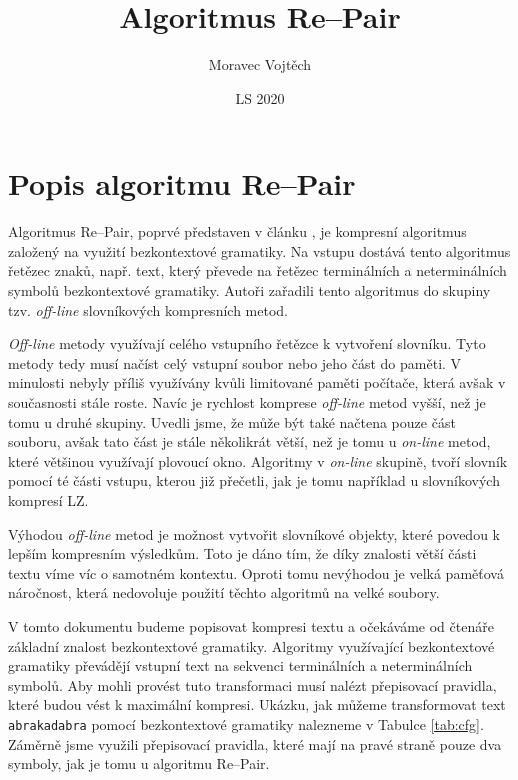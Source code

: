 \documentclass[a4paper,12pt]{article}
\author{Moravec Vojtěch}
\title{Algoritmus Re--Pair}
\date{LS 2020}
\begin{document}
\maketitle
\newpage

\section{Popis algoritmu Re--Pair}
Algoritmus Re--Pair, poprvé představen v článku \cite{892708}, je kompresní algoritmus založený na využití bezkontextové gramatiky. Na vstupu dostává tento algoritmus řetězec znaků, např. text, který převede na řetězec terminálních a neterminálních symbolů bezkontextové gramatiky. Autoři zařadili tento algoritmus do skupiny tzv. \emph{off-line} slovníkových kompresních metod.

\emph{Off-line} metody využívají celého vstupního řetězce k vytvoření slovníku. Tyto metody tedy musí načíst celý vstupní soubor nebo jeho část do paměti. V minulosti nebyly příliš využívány kvůli limitované paměti počítače, která avšak v současnosti stále roste. Navíc je rychlost komprese \emph{off-line} metod vyšší, než je tomu u druhé skupiny. Uvedli jsme, že může být také načtena pouze část souboru, avšak tato část je stále několikrát větší, než je tomu u \emph{on-line} metod, které většinou využívají plovoucí okno. Algoritmy v \emph{on-line} skupině, tvoří slovník pomocí té části vstupu, kterou již přečetli, jak je tomu například \linebreak u slovníkových kompresí LZ. 

Výhodou \emph{off-line} metod je možnost vytvořit slovníkové objekty, které povedou k lepším kompresním výsledkům. Toto je dáno tím, že díky znalosti větší části textu víme víc o samotném kontextu. Oproti tomu nevýhodou je velká paměťová náročnost, která nedovoluje použití těchto algoritmů na velké soubory.

V tomto dokumentu budeme popisovat kompresi textu a očekáváme od čtenáře základní znalost bezkontextové gramatiky. Algoritmy využívající bezkontextové gramatiky převádějí vstupní text na sekvenci terminálních a neterminálních symbolů. Aby mohli provést tuto transformaci musí nalézt přepisovací pravidla, které budou vést k maximální kompresi. Ukázku, jak můžeme transformovat text \texttt{abrakadabra} pomocí bezkontextové gramatiky nalezneme v Tabulce \ref{tab:cfg}. Záměrně jsme využili přepisovací pravidla, které mají na pravé straně pouze dva symboly, jak je tomu u algoritmu Re--Pair.
\end{document}
